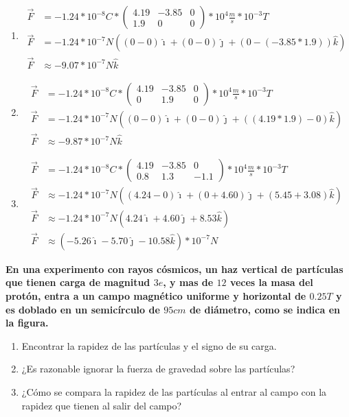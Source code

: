 \documentclass[10pt, twoside]{article}
\begin{document}
\begin{enumerate}[label=\alph*.]
	\item
		\begin{align*}
			\vec{F} &= -1.24*10^{-8}C*
			\begin{pmatrix}
				4.19 & -3.85 & 0 \\
				1.9 & 0 & 0
			\end{pmatrix}
			*10^4 \frac{m}{s} *10^{-3}T\\
			\vec{F} &= -1.24*10^{-7}N
			(
				(0-0)\hat{\imath}
				+(0-0)\hat{\jmath}
				+(0-(-3.85*1.9))\hat{k}
			)\\
			\vec{F} &\approx -9.07*10^{-7}N\hat{k}
		\end{align*}
	\item
		\begin{align*}
			\vec{F} &= -1.24*10^{-8}C*
			\begin{pmatrix}
				4.19 & -3.85 & 0 \\
				0 & 1.9 & 0
			\end{pmatrix}
			*10^4 \frac{m}{s} *10^{-3}T\\
			\vec{F} &= -1.24*10^{-7}N
			(
				(0-0)\hat{\imath}
				+(0-0)\hat{\jmath}
				+((4.19*1.9)-0)\hat{k}
			)\\
			\vec{F} &\approx -9.87*10^{-7}N\hat{k}
		\end{align*}
	\item
		\begin{align*}
				\vec{F} &= -1.24*10^{-8}C*
			\begin{pmatrix}
				4.19 & -3.85 & 0 \\
				0.8 & 1.3 & -1.1
			\end{pmatrix}
			*10^4 \frac{m}{s} *10^{-3}T\\
			\vec{F} &\approx -1.24*10^{-7}N
			(
				(4.24-0)\hat{\imath}
				+(0+4.60)\hat{\jmath}
				+(5.45+3.08)\hat{k}
			)\\
			\vec{F} &\approx -1.24*10^{-7}N
			(
				4.24\hat{\imath}
				+4.60\hat{\jmath}
				+8.53\hat{k}
			)\\
			\vec{F} &\approx
			(
				-5.26\hat{\imath}
				-5.70\hat{\jmath}
				-10.58\hat{k}
			)
			*10^{-7}N
		\end{align*}
\end{enumerate}

\textbf{
	\boldmath
	En una experimento con rayos cósmicos, un haz vertical de partículas que tienen
	carga de magnitud $3e$, y mas de $12$ veces la masa del protón,
	entra a un campo magnético uniforme y horizontal de $0.25T$ y es doblado
	en un semicírculo de $95cm$ de diámetro, como se indica en la figura.
}
\begin{enumerate}[label=\alph*.]
	\item Encontrar la rapidez de las partículas y el signo de su carga.
	\item ¿Es razonable ignorar la fuerza de gravedad sobre las partículas?
	\item ¿Cómo se compara la rapidez de las partículas al entrar al campo con
		la rapidez que tienen al salir del campo?
\end{enumerate}
\end{document}
